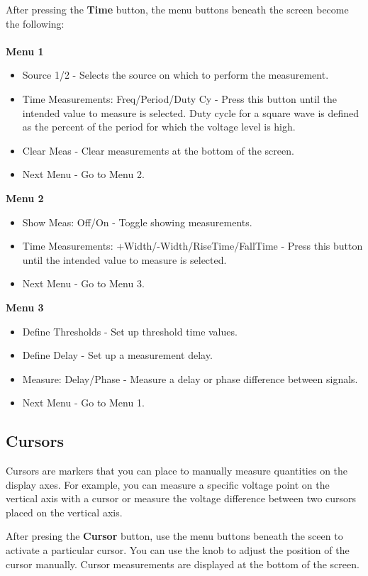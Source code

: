 \documentclass{article}
\begin{document}
After pressing the \textbf{Time} button, the menu buttons beneath the screen become the following:
~\\~\\
\textbf{Menu 1}
\begin{itemize}
\item Source 1/2  -  Selects the source on which to perform the measurement.
\item Time Measurements: Freq/Period/Duty Cy  -  Press this button until the intended value to measure is selected. Duty cycle for a square wave is defined as the percent of the period for which the voltage level is high.
\item Clear Meas  -  Clear measurements at the bottom of the screen.
\item Next Menu  -  Go to Menu 2.
\end{itemize}
\textbf{Menu 2}
\begin{itemize}
\item Show Meas: Off/On  -  Toggle showing measurements.
\item Time Measurements: +Width/-Width/RiseTime/FallTime  -  Press this button until the intended value to measure is selected.
\item Next Menu  -  Go to Menu 3.
\end{itemize}
\textbf{Menu 3}
\begin{itemize}
\item Define Thresholds  -  Set up threshold time values.
\item Define Delay  -  Set up a measurement delay.
\item Measure: Delay/Phase  -  Measure a delay or phase difference between signals.
\item Next Menu  -  Go to Menu 1.
\end{itemize}

\subsection{Cursors}
Cursors are markers that you can place to manually measure quantities on the display axes. For example, you can measure a specific voltage point on the vertical axis with a cursor or measure the voltage difference between two cursors placed on the vertical axis.

After presing the \textbf{Cursor} button, use the menu buttons beneath the sceen to activate a particular cursor. You can use the knob to adjust the position of the cursor manually. Cursor measurements are displayed at the bottom of the screen.
\end{document}
